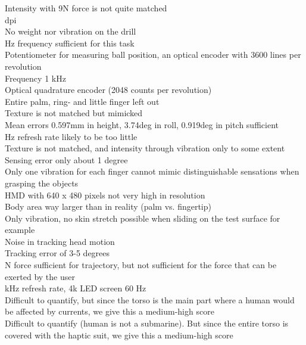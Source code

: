 \footnotemark[24]Intensity with 9N force is not quite matched \\
 dpi \\
\footnotemark[26]No weight nor vibration on the drill \\
 Hz frequency sufficient for this task \\
\footnotemark[28]Potentiometer for measuring ball position, an optical encoder with 3600 lines per revolution \\
\footnotemark[29]Frequency 1 kHz \\
\footnotemark[30]Optical quadrature encoder (2048 counts per revolution)	 \\
\footnotemark[31]Entire palm, ring- and little finger left out \\
\footnotemark[32]Texture is not matched but mimicked \\
\footnotemark[33]Mean errors 0.597mm in height, 3.74deg in roll, 0.919deg in pitch sufficient \\
 Hz refresh rate likely to be too little \\
\footnotemark[35]Texture is not matched, and intensity through vibration only to some extent \\
\footnotemark[36]Sensing error only about 1 degree \\
\footnotemark[37]Only one vibration for each finger cannot mimic distinguishable sensations when grasping the objects \\
\footnotemark[38]HMD with 640 x 480 pixels not very high  in resolution \\
\footnotemark[39]Body area way larger than in reality (palm vs. fingertip) \\
\footnotemark[40]Only vibration, no skin stretch possible when sliding on the test surface for example \\
\footnotemark[41]Noise in tracking head motion \\
\footnotemark[42]Tracking error of 3-5 degrees \\
 N force sufficient for trajectory, but not sufficient for the force that can be exerted by the user \\
 kHz refresh rate, 4k LED screen 60 Hz \\
\footnotemark[45]Difficult to quantify, but since the torso is the main part where a human would be affected by currents, we give this a medium-high score \\
\footnotemark[46]Difficult to quantify (human is not a submarine). But since the entire torso is covered with the haptic suit, we give this a medium-high score \\
